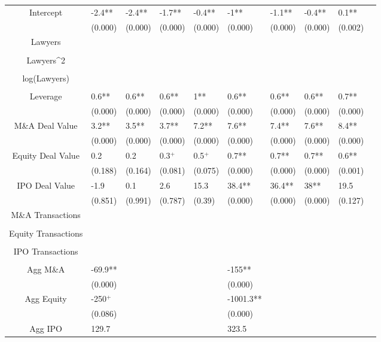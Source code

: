 \documentclass{article}
\begin{document}
\begin{table}[H]
\begin{tabular}{|clllllllll|}
Intercept & -2.4** & -2.4** & -1.7** & -0.4** & -1** & -1.1** & -0.4** & 0.1** & \\ 
   & (0.000) & (0.000) & (0.000) & (0.000) & (0.000) & (0.000) & (0.000) & (0.002) & \\ 
  Lawyers &  &  &  &  &  &  &  &  & \\ 
   &  &  &  &  &  &  &  &  & \\ 
  Lawyers^2 &  &  &  &  &  &  &  &  & \\ 
   &  &  &  &  &  &  &  &  & \\ 
  log(Lawyers) &  &  &  &  &  &  &  &  & \\ 
   &  &  &  &  &  &  &  &  & \\ 
  Leverage & 0.6** & 0.6** & 0.6** & 1** & 0.6** & 0.6** & 0.6** & 0.7** & \\ 
   & (0.000) & (0.000) & (0.000) & (0.000) & (0.000) & (0.000) & (0.000) & (0.000) & \\ 
  M\&A Deal Value & 3.2** & 3.5** & 3.7** & 7.2** & 7.6** & 7.4** & 7.6** & 8.4** & \\ 
   & (0.000) & (0.000) & (0.000) & (0.000) & (0.000) & (0.000) & (0.000) & (0.000) & \\ 
  Equity Deal Value & 0.2 & 0.2 & 0.3$^{+}$ & 0.5$^{+}$ & 0.7** & 0.7** & 0.7** & 0.6** & \\ 
   & (0.188) & (0.164) & (0.081) & (0.075) & (0.000) & (0.000) & (0.000) & (0.001) & \\ 
  IPO Deal Value & -1.9 & 0.1 & 2.6 & 15.3 & 38.4** & 36.4** & 38** & 19.5 & \\ 
   & (0.851) & (0.991) & (0.787) & (0.39) & (0.000) & (0.000) & (0.000) & (0.127) & \\ 
  M\&A Transactions &  &  &  &  &  &  &  &  & \\ 
   &  &  &  &  &  &  &  &  & \\ 
  Equity Transactions &  &  &  &  &  &  &  &  & \\ 
   &  &  &  &  &  &  &  &  & \\ 
  IPO Transactions &  &  &  &  &  &  &  &  & \\ 
   &  &  &  &  &  &  &  &  & \\ 
  Agg M\&A & -69.9** &  &  &  & -155** &  &  &  & \\ 
   & (0.000) &  &  &  & (0.000) &  &  &  & \\ 
  Agg Equity & -250$^{+}$ &  &  &  & -1001.3** &  &  &  & \\ 
   & (0.086) &  &  &  & (0.000) &  &  &  & \\ 
  Agg IPO & 129.7 &  &  &  & 323.5 &  &  &  & \\ 

\end{tabular}
\end{table}
\end{document}
